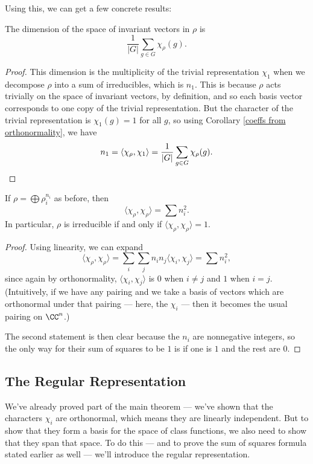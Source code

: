 Using this, we can get a few concrete results:

\begin{example}
    The dimension of the space of invariant vectors in $\rho$ is \[\frac{1}{\lvert G \rvert} \sum_{g \in G} \chi_\rho(g).\] 
\end{example}

\begin{proof}
    This dimension is the multiplicity of the trivial representation $\chi_1$ when we decompose $\rho$ into a sum of irreducibles, which is $n_1$. This is because $\rho$ acts trivially on the space of invariant vectors, by definition, and so each basis vector corresponds to one copy of the trivial representation. But the character of the trivial representation is $\chi_1(g) = 1$ for all $g$, so using Corollary \ref{coeffs from orthonormality}, we have \[n_1 = \langle \chi_\rho, \chi_1\rangle = \frac{1}{|G|} \sum_{g \in G} \chi_\rho(g). \qedhere\] 
\end{proof}

\begin{corollary}
    If $\rho = \bigoplus \rho_i^{n_i}$ as before, then \[\langle \chi_\rho, \chi_\rho \rangle = \sum n_i^2.\] In particular, $\rho$ is irreducible if and only if $\langle \chi_\rho, \chi_\rho \rangle = 1$. 
\end{corollary}

\begin{proof}
    Using linearity, we can expand \[\langle \chi_\rho, \chi_\rho \rangle = \sum_i \sum_j n_in_j \langle \chi_i, \chi_j \rangle = \sum n_i^2,\] since again by orthonormality, $\langle \chi_i, \chi_j \rangle$ is $0$ when $i \neq j$ and $1$ when $i = j$. (Intuitively, if we have any pairing and we take a basis of vectors which are orthonormal under that pairing --- here, the $\chi_i$ --- then it becomes the usual pairing on $\CC^n$.)
    
    The second statement is then clear because the $n_i$ are nonnegative integers, so the only way for their sum of squares to be $1$ is if one is $1$ and the rest are $0$.  
\end{proof}

\subsection{The Regular Representation}

We've already proved part of the main theorem --- we've shown that the characters $\chi_i$ are orthonormal, which means they are linearly independent. But to show that they form a basis for the space of class functions, we also need to show that they span that space. To do this --- and to prove the sum of squares formula stated earlier as well --- we'll introduce the regular representation. 

